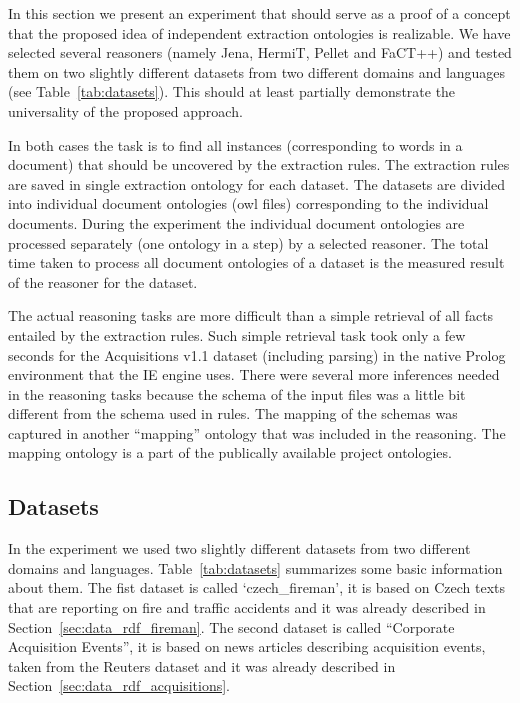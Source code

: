 In this section we present an experiment that should serve as a proof of a concept that the proposed idea of independent extraction ontologies is realizable. We have selected several reasoners (namely Jena, HermiT, Pellet and FaCT++) and tested them on two slightly different datasets from two different domains and languages (see Table~\ref{tab:datasets}). This should at least partially demonstrate the universality of the proposed approach.

In both cases the task is to find all instances (corresponding to words in a document) that should be uncovered by the extraction rules. The extraction rules are saved in single extraction ontology for each dataset. The datasets are divided into individual document ontologies (owl files) corresponding to the individual documents. During the experiment the individual document ontologies are processed separately (one ontology in a step) by a selected reasoner. The total time taken to process all document ontologies of a dataset is the measured result of the reasoner for the dataset.

The actual reasoning tasks are more difficult than a simple retrieval of all facts entailed by the extraction rules. Such simple retrieval task took only a few seconds for the Acquisitions v1.1 dataset (including parsing) in the native Prolog environment that the IE engine uses. There were several more inferences needed in the reasoning tasks because the schema of the input files was a little bit different from the schema used in rules. The mapping of the schemas was captured in another ``mapping'' ontology that was included in the reasoning. The mapping ontology is a part of the publically available project ontologies.


\subsection{Datasets} \label{sec:onto_datasets}

In the experiment we used two slightly different datasets from two different domains and languages.  Table~\ref{tab:datasets} summarizes some basic information about them. The fist dataset is called `czech\_fireman', it is based on Czech texts that are reporting on fire and traffic accidents and it was already described in Section~\ref{sec:data_rdf_fireman}. The second dataset is called ``Corporate Acquisition Events'', it is based on news articles describing acquisition events, taken from the Reuters dataset and it was already described in Section~\ref{sec:data_rdf_acquisitions}.

